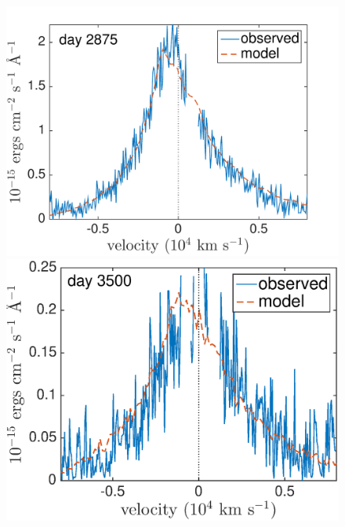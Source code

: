 \begin{figure}
\includegraphics[trim =30 35 0 0,clip=true,scale=0.39]{chapters/chapter5/images/clump_1/maximum/d2875Ha.pdf}
\includegraphics[trim =30 35 0 0,clip=true,scale=0.39]{chapters/chapter5/images/clump_1/maximum/d3500Ha}


\end{figure}
